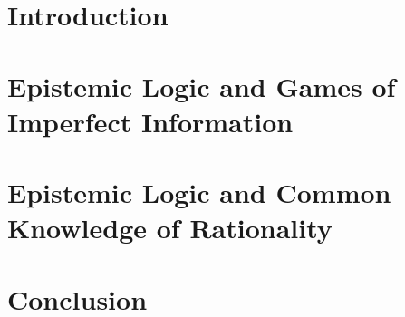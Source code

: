 \documentclass[a4paper,11pt]{article}
\author{Andreas David Lauritzen, s134849 \and%
        Christian Hildebrand Grevil, s093434 \and%
       Patrick Kasting, s124313}
\begin{document}

\pagebreak


\section{Introduction}


\section{Epistemic Logic and Games of Imperfect Information} \label{sec:imperfect-information}


\section{Epistemic Logic and Common Knowledge of Rationality} \label{sec:rationality}


\section{Conclusion} \label{sec:conclusion}




\end{document}
